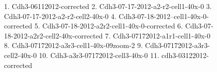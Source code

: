 \documentclass{article}
\begin{document}
\begin{figure}
  \centering
  \caption{1. Cdh3-06112012-corrected
2. Cdh3-07-17-2012-a2-r2-cell1-40x-0
3. Cdh3-07-17-2012-a2-r2-cell2-40x-0
4. Cdh3-07-18-2012--cell1-40x-0-corrected
5. Cdh3-07-18-2012-a2r2-cell1-40x-0-corrected
6. Cdh3-07-18-2012-a2r2-cell2-40x-corrected
7. Cdh3-07172012-a1r1-cell1-40x-0
8. Cdh3-07172012-a3r3-cell1-40x-09zoom-2
9. Cdh3-07172012-a3r3-cell2-40x-0
10. Cdh3-a3r3-07172012-cell3-40x-0
11. cdh3-03122012-corrected}
\end{figure}

\clearpage
\end{document}
